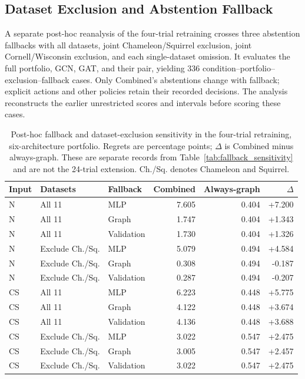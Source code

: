 \subsection{Dataset Exclusion and Abstention Fallback}
\label{sec:retraining_fallback}

A separate post-hoc reanalysis of the four-trial retraining crosses three abstention fallbacks with all datasets, joint Chameleon/Squirrel exclusion, joint Cornell/Wisconsin exclusion, and each single-dataset omission. It evaluates the full portfolio, GCN, GAT, and their pair, yielding 336 condition--portfolio--exclusion--fallback cases. Only Combined's abstentions change with fallback; explicit actions and other policies retain their recorded decisions. The analysis reconstructs the earlier unrestricted scores and intervals before scoring these cases.

\begin{table}[tbp]
\centering
\caption{Post-hoc fallback and dataset-exclusion sensitivity in the four-trial retraining, six-architecture portfolio. Regrets are percentage points; $\Delta$ is Combined minus always-graph. These are separate records from Table~\ref{tab:fallback_sensitivity} and are not the 24-trial extension. Ch./Sq. denotes Chameleon and Squirrel.}
\label{tab:retraining_fallback}
\small
\setlength{\tabcolsep}{3.2pt}
\begin{tabular}{@{}lllrrr@{}}
\toprule
Input & Datasets & Fallback & Combined & Always-graph & $\Delta$ \\
\midrule
N & All 11 & MLP & 7.605 & 0.404 & +7.200 \\
N & All 11 & Graph & 1.747 & 0.404 & +1.343 \\
N & All 11 & Validation & 1.730 & 0.404 & +1.326 \\
N & Exclude Ch./Sq. & MLP & 5.079 & 0.494 & +4.584 \\
N & Exclude Ch./Sq. & Graph & 0.308 & 0.494 & -0.187 \\
N & Exclude Ch./Sq. & Validation & 0.287 & 0.494 & -0.207 \\
\midrule
CS & All 11 & MLP & 6.223 & 0.448 & +5.775 \\
CS & All 11 & Graph & 4.122 & 0.448 & +3.674 \\
CS & All 11 & Validation & 4.136 & 0.448 & +3.688 \\
CS & Exclude Ch./Sq. & MLP & 3.022 & 0.547 & +2.475 \\
CS & Exclude Ch./Sq. & Graph & 3.005 & 0.547 & +2.457 \\
CS & Exclude Ch./Sq. & Validation & 3.022 & 0.547 & +2.475 \\
\bottomrule
\end{tabular}
\end{table}

